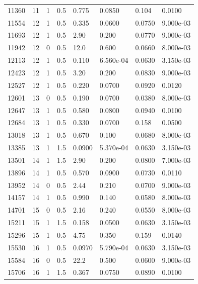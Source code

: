 \documentclass[preview]{standalone}
\begin{document}
{{{\begin{tabular}{L{1.2cm}C{1.2cm} C{0.3cm}C{0.5cm} C{1.4cm}C{1.4cm} C{1.4cm}C{1.4cm}}
  11360  &    11  & 1     & 0.5 &  0.775  & 0.0850  & 0.104 &  0.0100   \\ 
  11554  &    12  & 1     & 0.5 &  0.335  & 0.0600  & 0.0750 &  9.000e-03   \\ 
  11693  &    12  & 1     & 0.5 &  2.90  & 0.200  & 0.0770 &  9.000e-03   \\ 
  11942  &    12  & 0     & 0.5 &  12.0  & 0.600  & 0.0660 &  8.000e-03   \\ 
  12113  &    12  & 1     & 0.5 &  0.110  & 6.560e-04  & 0.0630 &  3.150e-03   \\ 
  12423  &    12  & 1     & 0.5 &  3.20  & 0.200  & 0.0830 &  9.000e-03   \\ 
  12527  &    12  & 1     & 0.5 &  0.220  & 0.0700  & 0.0920 &  0.0120   \\ 
  12601  &    13  & 0     & 0.5 &  0.190  & 0.0700  & 0.0380 &  8.000e-03   \\ 
  12647  &    13  & 1     & 0.5 &  0.580  & 0.0800  & 0.0940 &  0.0100   \\ 
  12684  &    13  & 1     & 0.5 &  0.330  & 0.0700  & 0.158 &  0.0500   \\ 
  13018  &    13  & 1     & 0.5 &  0.670  & 0.100  & 0.0680 &  8.000e-03   \\ 
  13385  &    13  & 1     & 1.5 &  0.0900  & 5.370e-04  & 0.0630 &  3.150e-03   \\ 
  13501  &    14  & 1     & 1.5 &  2.90  & 0.200  & 0.0800 &  7.000e-03   \\ 
  13896  &    14  & 1     & 0.5 &  0.570  & 0.0900  & 0.0730 &  0.0110   \\ 
  13952  &    14  & 0     & 0.5 &  2.44  & 0.210  & 0.0700 &  9.000e-03   \\ 
  14157  &    14  & 1     & 0.5 &  0.990  & 0.140  & 0.0580 &  8.000e-03   \\ 
  14701  &    15  & 0     & 0.5 &  2.16  & 0.240  & 0.0550 &  8.000e-03   \\ 
  15211  &    15  & 1     & 1.5 &  0.158  & 0.0500  & 0.0630 &  3.150e-03   \\ 
  15296  &    15  & 1     & 0.5 &  4.75  & 0.350  & 0.159 &  0.0140   \\ 
  15530  &    16  & 1     & 0.5 &  0.0970  & 5.790e-04  & 0.0630 &  3.150e-03   \\ 
  15584  &    16  & 0     & 0.5 &  22.2  & 0.500  & 0.0600 &  9.000e-03   \\ 
  15706  &    16  & 1     & 1.5 &  0.367  & 0.0750  & 0.0890 &  0.0100   \\ 

\end{tabular}}}}
\end{document}
